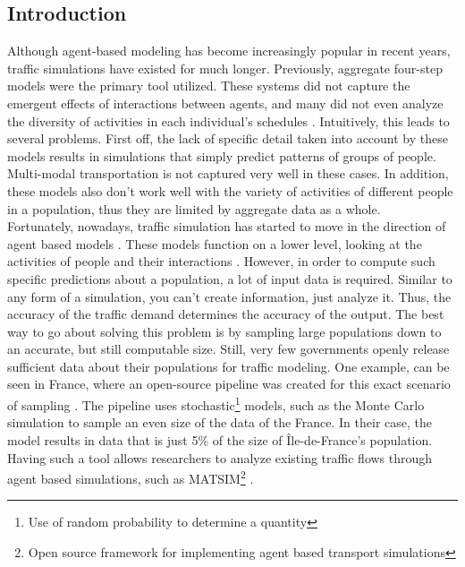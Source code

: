 \documentclass[11pt]{article}
\begin{document}
\begin{multicols}{2}
    \section{Introduction}
    \quad Although agent-based modeling has become increasingly popular in recent years, traffic simulations have existed for much longer. Previously, aggregate four-step models were the primary tool utilized. These systems did not capture the emergent effects of interactions between agents, and many did not even analyze the diversity of activities in each individual's schedules \cite{types-of-modeling}. Intuitively, this leads to several problems. First off, the lack of specific detail taken into account by these models results in simulations that simply predict patterns of groups of people. Multi-modal transportation is not captured very well in these cases. In addition, these models also don't work well with the variety of activities of different people in a population, thus they are limited by aggregate data as a whole. \\

    \quad Fortunately, nowadays, traffic simulation has started to move in the direction of agent based models \cite{ile-de-france}. These models function on a lower level, looking at the activities of people and their interactions \cite{agent-based-model}. However, in order to compute such specific predictions about a population, a lot of input data is required. Similar to any form of a simulation, you can't create information, just analyze it. Thus, the accuracy of the traffic demand determines the accuracy of the output. The best way to go about solving this problem is by sampling large populations down to an accurate, but still computable size. Still, very few governments openly release sufficient data about their populations for traffic modeling. One example, can be seen in France, where an open-source pipeline was created for this exact scenario of sampling \cite{ile-de-france}. The pipeline uses stochastic\footnote{Use of random probability to determine a quantity} models, such as the Monte Carlo simulation to sample an even size of the data of the France. In their case, the model results in data that is just 5\% of the size of Île-de-France's population. Having such a tool allows researchers to analyze existing traffic flows through agent based simulations, such as MATSIM\footnote{Open source framework for implementing agent based transport simulations} \cite{matsim}.\\


\end{multicols}
\end{document}
